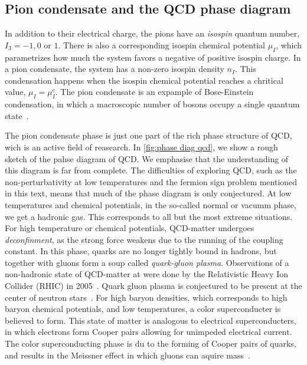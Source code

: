 \subsection*{Pion condensate and the QCD phase diagram}

In addition to their electrical charge, the pions have an \emph{isospin} quantum number, $I_3 = -1, 0$ or $1$.
There is also a corresponding isospin chemical potential $\mu_I$, which parametrizes how much the system favors a negative of positive isospin charge.
In a pion condensate, the system has a non-zero isospin density $n_I$.
This condensation happens when the isospin chemical potential reaches a chritical value, $\mu_I = \mu_I^c$.
The pion condensate is an expample of Bose-Einstein condensation, in which a macroscopic number of bosons occupy a single quantum state~\cite{Brandt:QCD_phase_diagram_with_isospin_chemical_potential,Brandt:QCD_phase_diagram_for_nonzero_isospin-asymmetry}.

The pion condensate phase is just one part of the rich phase structure of QCD, wich is an active field of reasearch.
In \autoref{fig:phase diag qcd}, we show a rough sketch of the pahse diagram of QCD.
We emphasise that the understanding of this diagram is far from complete.
The difficulties of exploring QCD, such as the non-perturbativity at low temperatures and the fermion sign problem mentioned in this text, means that much of the phase diagram is only conjectured.
At low temperatures and chemical potentials, in the so-called normal or vacumm phase, we get a hadronic gas.
This corresponds to all but the most extreme situations.
For high temperature or chemical potentials, QCD-matter undergoes \emph{deconfinment}, as the strong force weakens due to the running of the coupling constant.
In this phase, quarks are no longer tightly bound in hadrons, but together with gluons form a soup called \emph{quark-gluon plasma}.
Observations of a non-hadronic state of QCD-matter at were done by the Relativistic Heavy Ion Collider (RHIC) in 2005~\cite{2005:RHIC,2005:RHIC2}.
Quark gluon plasma is conjectured to be present at the center of neutron stars~\cite{from_hadrons_to_quarks}.
For high baryon densities, which corresponds to high baryon chemical potentials, and low temperatures, a color superconducter is believed to form.
This state of matter is analogous to electrical superconducters, in which electrons form Cooper pairs allowing for unimpeded electrical current.
The color superconducting phase is du to the forming of Cooper pairs of quarks, and results in the Meissner effect in which gluons can aquire mass~\cite{alford:color_superconductivity}.

